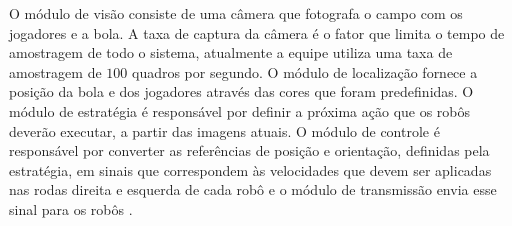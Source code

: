 O módulo de visão consiste de uma câmera que fotografa o campo com os jogadores e a bola. A taxa de captura da câmera é o fator que limita o tempo de amostragem de todo o sistema, atualmente a equipe utiliza uma taxa de amostragem de $100$ quadros por segundo. O módulo de localização fornece a posição da bola e dos jogadores através das cores que foram predefinidas. O módulo de estratégia é responsável por definir a próxima ação que os robôs deverão executar, a partir das imagens atuais. O módulo de controle é responsável por converter as referências de posição e orientação, definidas pela estratégia, em sinais que correspondem às velocidades que devem ser aplicadas nas rodas direita e esquerda de cada robô e o módulo de transmissão envia esse sinal para os robôs \cite{POTI}.\\



\newpage

